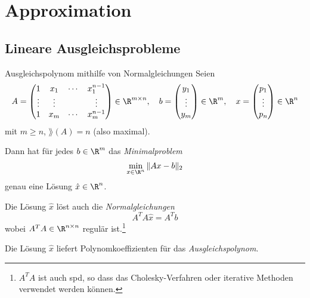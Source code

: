\section{Approximation}

\subsection{Lineare Ausgleichsprobleme}

\begin{defi}{Ausgleichspolynom mithilfe von Normalgleichungen}
    Seien
    \[
        A = \begin{pmatrix}
            1      & x_1    & \cdots & x_1^{n-1} \\
            \vdots & \vdots &        & \vdots    \\
            1      & x_m    & \cdots & x_m^{n-1}
        \end{pmatrix}
        \in \R^{m \times n}
        , \quad
        b = \begin{pmatrix}
            y_1    \\
            \vdots \\
            y_m
        \end{pmatrix}
        \in \R^{m}
        , \quad
        x = \begin{pmatrix}
            p_1    \\
            \vdots \\
            p_n
        \end{pmatrix}
        \in \R^{n}
    \]
    mit $m \geq n$, $\rang(A) = n$ (also maximal).

    Dann hat für jedes $b \in \R^m$ das \emph{Minimalproblem}
    \[
        \min_{x \in \R^n} \|Ax - b\|_2
    \]
    genau eine Lösung $\hat{x} \in \R^n$.

    Die Lösung $\hat{x}$ löst auch die \emph{Normalgleichungen}
    \[
        A^T A \hat{x} = A^T b
    \]
    wobei $A^T A \in \R^{n \times n}$ regulär ist.\footnote{$A^TA$ ist auch spd, so dass das Cholesky-Verfahren oder iterative Methoden verwendet werden können.}

    Die Lösung $\hat{x}$ liefert Polynomkoeffizienten für das \emph{Ausgleichspolynom}.
\end{defi}

